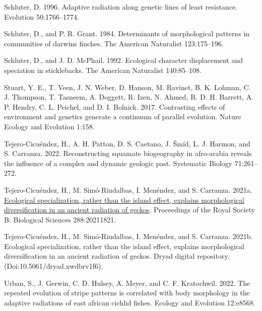 \documentclass[
  11pt,
]{article}
\newlength{\cslhangindent}
\newlength{\cslentryspacingunit} %
\newenvironment{CSLReferences}[2] %
 {%
  \setlength{\parindent}{0pt}
  \ifodd #1
  \let\oldpar\par
  \def\par{\hangindent=\cslhangindent\oldpar}
  \fi
  \setlength{\parskip}{#2\cslentryspacingunit}
 }%
 {}
\begin{document}
\begin{CSLReferences}{1}{0}
\leavevmode{}%
Schluter, D. 1996. Adaptive radiation along genetic lines of least
resistance. Evolution 50:1766--1774.

\leavevmode{}%
Schluter, D., and P. R. Grant. 1984. Determinants of morphological
patterns in communities of darwin{\textquotesingle}s finches. The
American Naturalist 123:175--196.

\leavevmode{}%
Schluter, D., and J. D. McPhail. 1992. Ecological character displacement
and speciation in sticklebacks. The American Naturalist 140:85--108.

\leavevmode{}%
Stuart, Y. E., T. Veen, J. N. Weber, D. Hanson, M. Ravinet, B. K.
Lohman, C. J. Thompson, T. Tasneem, A. Doggett, R. Izen, N. Ahmed, R. D.
H. Barrett, A. P. Hendry, C. L. Peichel, and D. I. Bolnick. 2017.
Contrasting effects of environment and genetics generate a continuum of
parallel evolution. Nature Ecology and Evolution 1:158.

\leavevmode{}%
Tejero-Cicuéndez, H., A. H. Patton, D. S. Caetano, J. Šmíd, L. J.
Harmon, and S. Carranza. 2022. Reconstructing squamate biogeography in
afro-arabia reveals the influence of a complex and dynamic geologic
past. Systematic Biology 71:261--272.

\leavevmode{}%
Tejero-Cicuéndez, H., M. Simó-Riudalbas, I. Menéndez, and S. Carranza.
2021a. \href{https://doi.org/10.1098/rspb.2021.1821}{Ecological
specialization, rather than the island effect, explains morphological
diversification in an ancient radiation of geckos}. Proceedings of the
Royal Society B: Biological Sciences 288:20211821.

\leavevmode{}%
Tejero-Cicuéndez, H., M. Simó-Riudalbas, I. Menéndez, and S. Carranza.
2021b. Ecological specialization, rather than the island effect,
explains morphological diversification in an ancient radiation of
geckos. Dryad digital repository. (Doi:10.5061/dryad.xwdbrv1f6).

\leavevmode{}%
Urban, S., J. Gerwin, C. D. Hulsey, A. Meyer, and C. F. Kratochwil.
2022. The repeated evolution of stripe patterns is correlated with body
morphology in the adaptive radiations of east african cichlid fishes.
Ecology and Evolution 12:e8568.


\end{CSLReferences}
\end{document}
